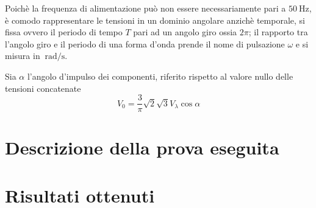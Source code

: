 \documentclass[a4paper,10pt]{article}
\begin{document}
Poichè la frequenza di alimentazione può non essere necessariamente pari a 
$\SI{50}{\hertz}$, è comodo rappresentare le tensioni in un dominio angolare anzichè 
temporale, si fissa ovvero il periodo di tempo \(T\) pari ad un angolo giro ossia 
\(2\pi\); il rapporto tra l'angolo giro e il periodo di una forma d'onda prende il
nome di pulsazione \(\omega\) e si misura in $\SI{}{\radian\per\second}$.



Sia \(\alpha\) l'angolo d'impulso dei componenti, riferito rispetto al valore nullo
delle tensioni concatenate
\begin{equation}
 V_0 = \frac{3}{\pi} \sqrt{2} \sqrt{3} V_\lambda \cos\alpha
 \label{eq:valore_medio_tensione_ponte}
\end{equation}


\section{Descrizione della prova eseguita}

\section{Risultati ottenuti}
\end{document}
